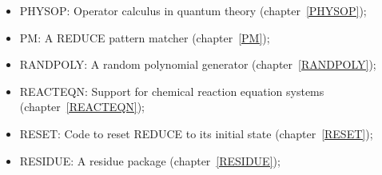 \begin{itemize}
\item
{PHYSOP: Operator calculus in quantum theory}
(chapter~\ref{PHYSOP}); 

\item
{PM: A REDUCE pattern matcher} (chapter~\ref{PM});

\item
{RANDPOLY: A random polynomial generator} (chapter~\ref{RANDPOLY});

\item
{REACTEQN: Support for chemical reaction equation systems}
(chapter~\ref{REACTEQN}); 

\item
{RESET: Code to reset REDUCE to its initial state}
(chapter~\ref{RESET}); 

\item
{RESIDUE: A residue package} (chapter~\ref{RESIDUE});


\end{itemize}
